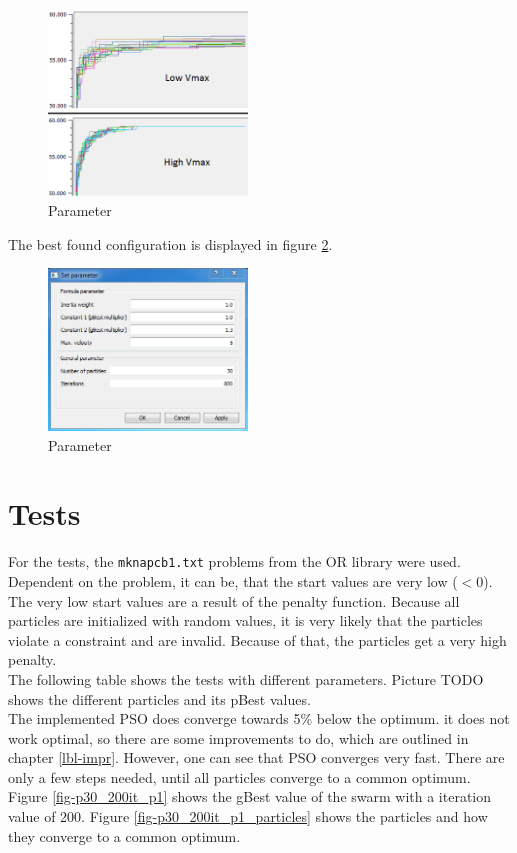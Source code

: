 \documentclass{article}
\begin{document}
\begin{figure}[H]
    \centering
    \includegraphics[width=200px]{images/vmax.PNG}
    \caption{Parameter}
    \label{fig-vmax}
\end{figure}

The best found configuration is displayed in figure \ref{fig-param}.

\begin{figure}[H]
    \centering
    \includegraphics[width=200px]{images/parameter.PNG}
    \caption{Parameter}
    \label{fig-param}
\end{figure}

\section{Tests}
\label{lbl-tests}
For the tests, the \lstinline$mknapcb1.txt$ problems from the OR library were used. \\
Dependent on the problem, it can be, that the start values are very low ($< 0$). The very low start values are a result of the penalty function. Because all particles are initialized with random values, it is very likely that the particles violate a constraint and are invalid. Because of that, the particles get a very high penalty.\\

The following table shows the tests with different parameters.
Picture TODO shows the different particles and its pBest values.\\

The implemented PSO does converge towards 5\% below the optimum. it does not work optimal, so there are some improvements to do, which are outlined in chapter \ref{lbl-impr}. However, one can see that PSO converges very fast. There are only a few steps needed, until all particles converge to a common optimum. Figure \ref{fig-p30_200it_p1} shows the gBest value of the swarm with a iteration value of 200. Figure \ref{fig-p30_200it_p1_particles} shows the particles and how they converge to a common optimum.
\end{document}
